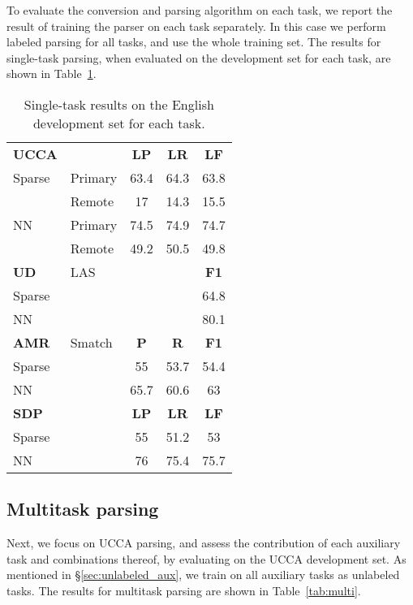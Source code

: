 \documentclass[11pt,a4paper]{article}
\begin{document}
To evaluate the conversion and parsing algorithm on each task, we report the result
of training the parser on each task separately.
In this case we perform labeled parsing for all tasks, and use the whole training set.
The results for single-task parsing, when evaluated on the development set for each task,
are shown in Table~\ref{tab:single}.



\begin{table}
\begin{tabular}{llccc}
\textbf{UCCA} & & \textbf{LP} & \textbf{LR} & \textbf{LF} \\
Sparse & \small Primary & 63.4 & 64.3 & 63.8 \\
       & \small Remote & 17 & 14.3 & 15.5 \\
NN & \small Primary & 74.5 & 74.9 & 74.7 \\
       & \small Remote & 49.2 & 50.5 & 49.8 \\
\hline
\textbf{UD} & \small LAS & & & \textbf{F1} \\
Sparse & & & & 64.8 \\
NN & & & & 80.1 \\
\hline
\textbf{AMR} & \small Smatch & \textbf{P} & \textbf{R} & \textbf{F1} \\
Sparse & & 55 & 53.7 & 54.4 \\
NN & & 65.7 & 60.6 & 63 \\
\hline
\textbf{SDP} & & \textbf{LP} & \textbf{LR} & \textbf{LF} \\
Sparse & & 55 & 51.2 & 53 \\
NN & & 76 & 75.4 & 75.7
\end{tabular}
\caption{Single-task results on the English development set for each task.\label{tab:single}}
\end{table}


\subsection{Multitask parsing}\label{sec:results_multi}

Next, we focus on UCCA parsing, and assess the contribution of each auxiliary task
and combinations thereof, by evaluating on the UCCA development set.
As mentioned in \S\ref{sec:unlabeled_aux}, we train on all auxiliary tasks as unlabeled tasks.
The results for multitask parsing are shown in Table~\ref{tab:multi}.
\end{document}
